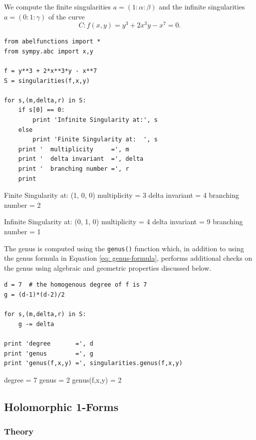 We compute the finite singularities $a = (1 : \alpha : \beta)$ and the
infinite singularities $a = (0 : 1 : \gamma)$ of the curve
\[
    C : f(x,y) = y^3 + 2x^3y - x^7 = 0.
\]
\begin{lstlisting}
from abelfunctions import *
from sympy.abc import x,y

f = y**3 + 2*x**3*y - x**7
S = singularities(f,x,y)

for s,(m,delta,r) in S:
    if s[0] == 0:
        print 'Infinite Singularity at:', s
    else
        print 'Finite Singularity at:  ', s
    print '  multiplicity     =', m
    print '  delta invariant  =', delta
    print '  branching number =', r
    print
\end{lstlisting}
\begin{pyoutput}
Finite Singularity at:   (1, 0, 0)
  multiplicity     = 3
  delta invariant  = 4
  branching number = 2

Infinite Singularity at: (0, 1, 0)
  multiplicity     = 4
  delta invariant  = 9
  branching number = 1
\end{pyoutput}
The genus is computed using the {\tt genus()} function which, in
addition to using the genus formula in Equation \eqref{eq:
  genus-formula}, performs additional checks on the genus using
algebraic and geometric properties discussed below.
\begin{lstlisting}[firstnumber=16]
d = 7  # the homogenous degree of f is 7
g = (d-1)*(d-2)/2

for s,(m,delta,r) in S:
    g -= delta

print 'degree       =', d
print 'genus        =', g
print 'genus(f,x,y) =', singularities.genus(f,x,y)
\end{lstlisting}
\begin{pyoutput}
degree       = 7
genus        = 2
genus(f,x,y) = 2
\end{pyoutput}

\subsection{Holomorphic 1-Forms}

%
\subsubsection*{Theory}
%

